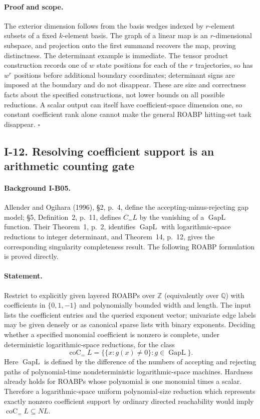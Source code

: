\paragraph{Proof and scope.}
The exterior dimension follows from the basis wedges indexed
by $r$-element subsets of a fixed $k$-element basis.  The graph
of a linear map is an $r$-dimensional subspace, and projection
onto the first summand recovers the map, proving distinctness.
The determinant example is immediate.  The tensor product
construction records one of $w$ state positions for each of
the $r$ trajectories, so has $w^r$ positions before additional
boundary coordinates; determinant signs are imposed at the
boundary and do not disappear.  These are size and correctness
facts about the specified constructions, not lower bounds on
all possible reductions.  A scalar output can itself have
coefficient-space dimension one, so constant coefficient rank
alone cannot make the general ROABP hitting-set task disappear.
\hfill$\square$

\subsection{I-12. Resolving coefficient support is an arithmetic counting gate}
\label{I-12}

\paragraph{Background I-B05.}
Allender and Ogihara (1996), \S2, p.~4, define the accepting-minus-rejecting
gap model; \S5, Definition~2, p.~11, defines $C_{=}L$ by the vanishing
of a $\operatorname{GapL}$ function.  Their Theorem~1, p.~2, identifies
$\operatorname{GapL}$ with logarithmic-space reductions to integer
determinant, and Theorem~14, p.~12, gives the corresponding singularity
completeness result.  The following ROABP formulation is proved directly.

\paragraph{Statement.}
Restrict to explicitly given layered ROABPs over $\mathbb Z$
(equivalently over $\mathbb Q$) with coefficients in
$\{0,1,-1\}$ and polynomially bounded width and length.  The input
lists the coefficient entries and the queried exponent vector;
univariate edge labels may be given densely or as canonical sparse
lists with binary exponents.  Deciding
whether a specified monomial coefficient is nonzero is complete,
under deterministic logarithmic-space reductions, for the class
\[
 \operatorname{coC}_{=}L
   =\{\{x:g(x)\ne0\}:g\in\operatorname{GapL}\}.
\]
Here $\operatorname{GapL}$ is defined by the difference of the
numbers of accepting and rejecting paths of polynomial-time
nondeterministic logarithmic-space machines.  Hardness already
holds for ROABPs whose polynomial is one monomial times a scalar.
Therefore a logarithmic-space uniform polynomial-size reduction
which represents exactly nonzero coefficient support by ordinary
directed reachability would imply
$\operatorname{coC}_{=}L\subseteq NL$.

